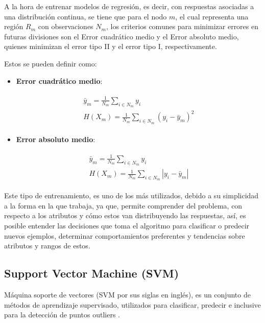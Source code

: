 A la hora de entrenar modelos de regresión, es decir, con respuestas asociadas a una distribución continua, se tiene que para el nodo $m$, el cual representa una región $R_{m}$ con observaciones $N_{m}$, los criterios comunes para minimizar errores en futuras divisiones son el Error cuadrático medio y el Error absoluto medio, quienes minimizan el error tipo II y el error tipo I, respectivamente.

Estos se pueden definir como:

\begin{itemize}
	
	\item \textbf{Error cuadrático medio}: 
	
	\begin{align}\begin{aligned}\bar{y}_m = \frac{1}{N_m} \sum_{i \in N_m} y_i\\H(X_m) = \frac{1}{N_m} \sum_{i \in N_m} (y_i - \bar{y}_m)^2\end{aligned}\end{align}
	
	\item \textbf{Error absoluto medio}: 
	
	\begin{align}\begin{aligned}\bar{y}_m = \frac{1}{N_m} \sum_{i \in N_m} y_i\\H(X_m) = \frac{1}{N_m} \sum_{i \in N_m} |y_i - \bar{y}_m|\end{aligned}\end{align}
\end{itemize}

Este tipo de entrenamiento, es uno de los más utilizados, debido a su simplicidad a la forma en la que trabaja, ya que, permite comprender del problema, con respecto a los atributos y cómo estos van distribuyendo las respuestas, así, es posible entender las decisiones que toma el algoritmo para clasificar o predecir nuevos ejemplos, determinar comportamientos preferentes y tendencias sobre atributos y rangos de estos.

\subsection{Support Vector Machine (SVM)}

Máquina soporte de vectores (SVM por sus siglas en inglés), es un conjunto de métodos de aprendizaje supervisado, utilizados para clasificar, predecir e inclusive para la detección de puntos outliers  \cite{scholkopf2001learning}. 

